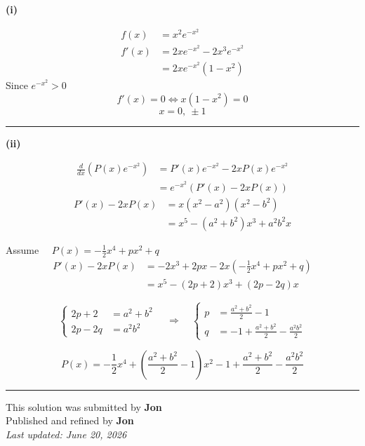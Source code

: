 \documentclass[12pt]{article}
\begin{document}
\newcommand{\ds}{\displaystyle}

\textbf{(i)}


\begin{align*}
f(x)&=x^2e^{-x^2}\\
f'(x)&=2xe^{-x^2}-2x^3e^{-x^2}\\
&=2xe^{-x^2}(1-x^2)
\end{align*}
Since $e^{-x^2}>0$
$$f'(x)=0\iff x(1-x^2)=0$$
$$\boxed{x=0,\ \pm1}$$

\bigskip\hrule\bigskip

\textbf{(ii)}

\begin{align*}
\frac{d}{dx}\left(P(x)e^{-x^2}\right)
&=P'(x)e^{-x^2}-2xP(x)e^{-x^2}\\
&=e^{-x^2}\left(P'(x)-2xP(x)\right)
\end{align*}
\begin{align*}
P'(x)-2xP(x)&=x(x^2-a^2)(x^2-b^2)\\
&=x^5-(a^2+b^2)x^3+a^2b^2x
\end{align*}

Assume $\displaystyle \quad P(x)=-\frac12x^4+px^2+q$
\begin{align*}
P'(x)-2xP(x)&=-2x^3+2px-2x\left(-\frac12x^4+px^2+q\right)\\
&=x^5-(2p+2)x^3+(2p-2q)x
\end{align*}

$$
\left\{
\begin{aligned}
2p+2&=a^2+b^2\\
2p-2q&=a^2b^2
\end{aligned}
\right.
\quad\Longrightarrow\quad
\left\{
\begin{aligned}
p&=\frac{a^2+b^2}{2}-1\\
q&=-1+\frac{a^2+b^2}{2}-\frac{a^2b^2}{2}
\end{aligned}
\right.
$$


$$\boxed{P(x)=-\frac12x^4+\left(\frac{a^2+b^2}{2}-1\right)x^2-1+\frac{a^2+b^2}{2}-\frac{a^2b^2}{2}}$$

\bigskip
\hrule
\begin{center}
    This solution was submitted by \textbf{Jon}\\[4pt]
    Published and refined by \textbf{Jon}\\[8pt]
    \textit{Last updated: June 20, 2026}
\end{center}
\end{document}
